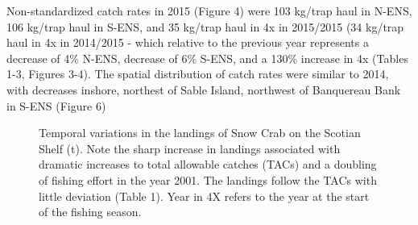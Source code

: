 \documentclass[paper=a4, fontsize=11pt]{article}
\newcommand{\D}{.}
\newcommand{\e}{/home/michelle/ecomod_data/}
\newcommand{\es}{snowcrab/}
\newcommand{\Ay}{assessments/2015/}
\begin{document}
Non-standardized catch rates in 2015 (Figure 4) were 103 kg/trap haul in N-ENS, 106 kg/trap haul in S-ENS, and 35 kg/trap haul in 4x in 2015/2015 (34 kg/trap haul in 4x in 2014/2015 - which relative to the previous year represents a decrease of 4\% N-ENS, decrease of 6\% S-ENS, and a 130\% increase in 4x (Tables 1-3, Figures 3-4). The spatial distribution of catch rates were similar to 2014, with decreases inshore, northest of Sable Island, northwest of Banquereau Bank in S-ENS (Figure 6)


\begin{figure} [h]

	\caption{Temporal variations in the landings of Snow Crab on the Scotian Shelf (t). Note the sharp increase in landings associated with dramatic increases to total allowable catches (TACs) and a doubling of fishing effort in the year 2001. The landings follow the TACs with little deviation (Table 1). Year in 4X refers to the year at the start of the fishing season.}
\end{figure}
\clearpage
\end{document}
